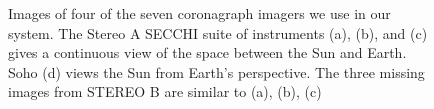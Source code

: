 \documentclass[journal]{vgtc}                %
\begin{document}
\begin{figure}
{}
\caption{Images of four of the seven coronagraph imagers we use in our system. The Stereo A SECCHI suite of instruments (a), (b), and (c) gives a continuous view of the space between the Sun and Earth. Soho (d) views the Sun from Earth's perspective. The three missing images from STEREO B are similar to (a), (b), (c)}
\label{fig:coronagraph}
\end{figure}
\end{document}
